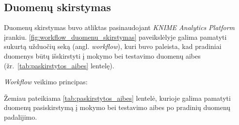 \subsection{Duomenų skirstymas}
\label{subsec:duomenu_skirstymas}

Duomenų skirstymas buvo atliktas pasinaudojant \textit{KNIME Analytics Platform} \cite{KNIME} įrankiu. \ref{fig:workflow_duomenu_skirstymas} paveikslėlyje galima pamatyti sukurtą užduočių seką (angl. \textit{workflow}), kuri buvo paleista, kad pradiniai duomenys \cite{iris_53} būtų išskirstyti į mokymo bei testavimo duomenų aibes (žr.~\ref{tab:paskirstytos_aibes} lentelę).



\textit{Workflow} veikimo principas:


Žemiau pateikiama \ref{tab:paskirstytos_aibes} lentelė, kurioje galima pamatyti duomenų pasiskirstymą į mokymo bei testavimo aibes po pradinių duomenų padalijimo.
